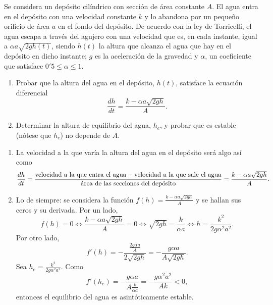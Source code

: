 \documentclass[11pt]{report}
\begin{document}
\begin{exercise}
    Se considera un depósito cilíndrico con sección de área constante $A$. El agua entra en el depósito con una velocidad constante $k$ y lo abandona por un pequeño orificio de área $a$ en el fondo del depósito. De acuerdo con la ley de Torricelli, el agua escapa a través del agujero con una velocidad que es, en cada instante, igual a $\alpha a \sqrt{2gh(t)}$, siendo $h(t)$ la altura que alcanza el agua que hay en el depósito en dicho instante; $g$ es la aceleración de la gravedad y $\alpha$, un coeficiente que satisface $0'5\leq \alpha \leq 1$.
    \begin{enumerate}
        \item Probar que la altura del agua en el depósito, $h(t)$, satisface la ecuación diferencial
        \[\frac{dh}{dt} = \frac{k-\alpha a \sqrt{2gh}}{A}.\]
        \item Determinar la altura de equilibrio del agua, $h_e$, y probar que es estable (nótese que $h_e$) no depende de $A$.
    \end{enumerate}
\end{exercise}

\begin{solution}
    \hfill
    \begin{enumerate}
        \item La velocidad a la que varía la altura del agua en el depósito será algo así como
        \[\frac{dh}{dt} = \frac{\textup{velocidad a la que entra el agua} - \textup{velocidad a la que sale el agua}}{\textup{área de las secciones del depósito}} = \frac{k-\alpha a \sqrt{2gh}}{A}.\]
        \item Lo de siempre: se considera la función $f(h) = \frac{k-\alpha a\sqrt{2gh}}{A}$ y se hallan sus ceros y su derivada. Por un lado,
        \[f(h) = 0 \iff \frac{k-\alpha a \sqrt{2gh}}{A} = 0 \iff \sqrt{2gh} = \frac{k}{\alpha a} \iff h = \frac{k^2}{2g\alpha^2 a^2}.\]
        Por otro lado,
        \[f'(h) = -\frac{\frac{2g\alpha a}{A}}{2\sqrt{2gh}} = -\frac{g\alpha a}{A\sqrt{2gh}}.\]
        Sea $h_e = \frac{k^2}{2g\alpha^2 a^2}$. Como
        \[f'(h_e) = -\frac{g\alpha a}{A\frac{k}{\alpha a}} = -\frac{g\alpha^2a^2}{Ak}<0,\]
        entonces el equilibrio del agua es asintóticamente estable.
    \end{enumerate}
\end{solution}

\addtocounter{exercise}{1}
\end{document}
